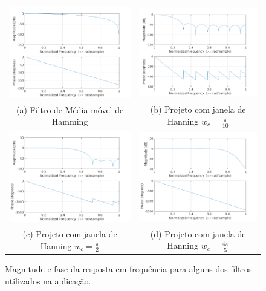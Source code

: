 \begin{figure}[!hbt]
\centering
\begin{tabular}{cc}
\includegraphics[width=0.45\linewidth]{figs/filter-response-hanningFilter.png} &
\includegraphics[width=0.45\linewidth]{figs/filter-response-wc_0_1pi.png}\\
(a) Filtro de Média móvel de Hamming & (b) Projeto com janela de Hanning $w_c=\frac{\pi}{10}$ \\
\includegraphics[width=0.45\linewidth]{figs/filter-response-wc_0_5pi.png} &
\includegraphics[width=0.45\linewidth]{figs/filter-response-wc_0_8pi.png} \\
(c) Projeto com janela de Hanning $w_c=\frac{\pi}{2}$ & (d) Projeto com janela de Hanning $w_c=\frac{4\pi}{5}$ \\
\end{tabular}
\caption{Magnitude e fase da resposta em frequência para alguns dos filtros utilizados na aplicação.}
\label{fig:filter-design-frequency-response}
\end{figure}

